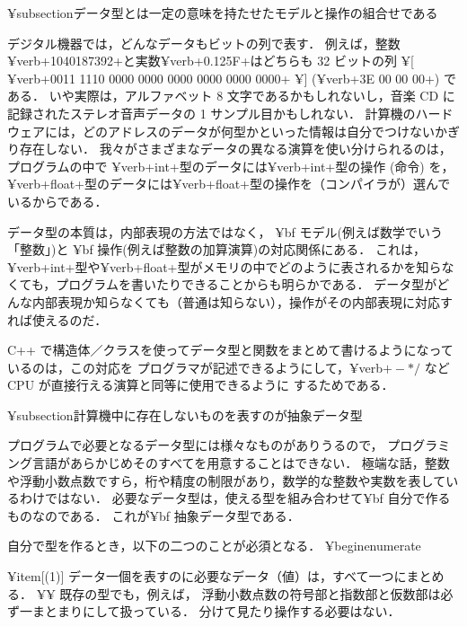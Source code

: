 ¥subsection{データ型とは一定の意味を持たせたモデルと操作の組合せである}

デジタル機器では，どんなデータもビットの列で表す．
例えば，整数¥verb+1040187392+と実数¥verb+0.125F+はどちらも 32 ビットの列 
¥[
¥verb+0011 1110 0000 0000 0000 0000 0000 0000+
¥]
(¥verb+3E 00 00 00+) である．
いや実際は，アルファベット 8 文字であるかもしれないし，音楽 CD に
記録されたステレオ音声データの 1 サンプル目かもしれない．
計算機のハードウェアには，どのアドレスのデータが何型かといった情報は自分でつけないかぎり存在しない．
%
我々がさまざまなデータの異なる演算を使い分けられるのは，
プログラムの中で ¥verb+int+型のデータには¥verb+int+型の操作 (命令) を，
¥verb+float+型のデータには¥verb+float+型の操作を（コンパイラが）選んでいるからである．

データ型の本質は，内部表現の方法ではなく，
{¥bf モデル}(例えば数学でいう「整数」)と
{¥bf 操作}(例えば整数の加算演算)の対応関係にある．
これは，¥verb+int+型や¥verb+float+型がメモリの中でどのように表されるかを知らなくても，プログラムを書いたりできることからも明らかである．
データ型がどんな内部表現か知らなくても（普通は知らない），操作がその内部表現に対応すれば使えるのだ．

C++ で構造体／クラスを使ってデータ型と関数をまとめて書けるようになっているのは，この対応を
プログラマが記述できるようにして，¥verb$+-*/$ など CPU が直接行える演算と同等に使用できるように
するためである．



¥subsection{計算機中に存在しないものを表すのが抽象データ型}

プログラムで必要となるデータ型には様々なものがありうるので，
プログラミング言語があらかじめそのすべてを用意することはできない．
極端な話，整数や浮動小数点数ですら，桁や精度の制限があり，数学的な整数や実数を表しているわけではない．
必要なデータ型は，使える型を組み合わせて{¥bf 自分で作るもの}なのである．
これが{¥bf 抽象データ型}である．

自分で型を作るとき，以下の二つのことが必須となる．
¥begin{enumerate}

 ¥item[(1)] データ一個を表すのに必要なデータ（値）は，すべて一つにまとめる．	¥¥
既存の型でも，例えば，
浮動小数点数の符号部と指数部と仮数部は必ず一まとまりにして扱っている．
分けて見たり操作する必要はない．

